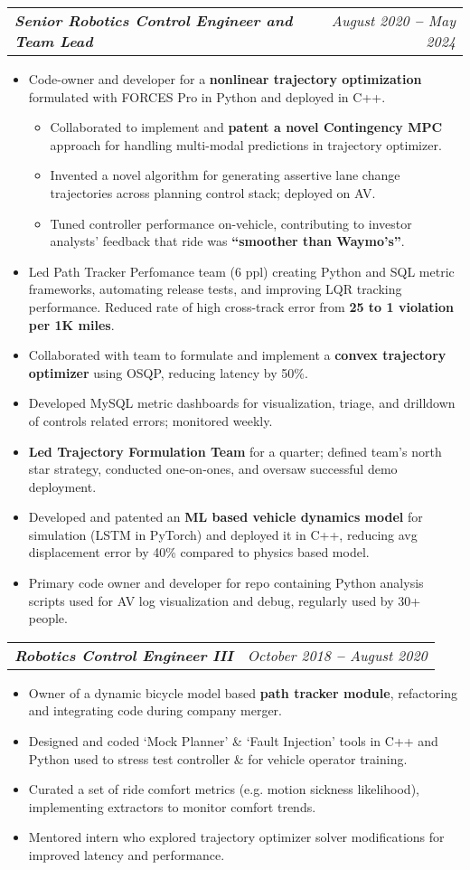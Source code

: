 \documentclass[letterpaper,11pt]{article}
\makeatletter
\def\vspaceAfterBullets{3pt} %
\def\bulletIndent{15pt} %
\newcommand{\bulletItem}[1]{
  \item\small{
    {#1}
  }
}
\newcommand{\titleAndDateHeading}[2]{
    \item
    \begin{tabular*}{1.0\textwidth}[b]{l@{\extracolsep{\fill}}r}
      \textit{\textbf{\small#1}} & \textit{\small #2}
    \end{tabular*}
}
\newcommand{\outerBulletListStart}{\begin{itemize}[leftmargin=\bulletIndent]}
\newcommand{\outerBulletListEnd}{\end{itemize}\vspace{\vspaceAfterBullets}}
\newcommand{\innerBulletListStart}{\begin{itemize}[leftmargin=\bulletIndent]}
\newcommand{\innerBulletListEnd}{\end{itemize}}
\makeatother
\begin{document}
\titleAndDateHeading
{Senior Robotics Control Engineer and Team Lead}{August 2020 \textbf{--} May 2024}
\outerBulletListStart
\bulletItem{Code-owner and developer for a \textbf{nonlinear trajectory optimization} formulated with FORCES Pro in Python and deployed in C++.}
\innerBulletListStart
\bulletItem{Collaborated to implement and \textbf{patent a novel Contingency MPC} approach for handling multi-modal predictions in trajectory optimizer.}
\bulletItem{Invented a novel algorithm for generating assertive lane change trajectories across planning control stack; deployed on AV.}
\bulletItem{Tuned controller performance on-vehicle, contributing to investor analysts’ feedback that ride was \textbf{“smoother than Waymo’s”}.}
\innerBulletListEnd
\bulletItem{Led Path Tracker Perfomance team (6 ppl) creating Python and SQL metric frameworks, automating release tests, and improving LQR tracking performance. Reduced rate of high cross-track error from \textbf{25 to 1 violation per 1K miles}.}
\bulletItem{Collaborated with team to formulate and implement a \textbf{convex trajectory optimizer} using OSQP, reducing latency by 50\%.}
\bulletItem{Developed MySQL metric dashboards for visualization, triage, and drilldown of controls related errors; monitored weekly.}
\bulletItem{\textbf{Led Trajectory Formulation Team} for a quarter; defined team’s north star strategy, conducted one-on-ones, and oversaw successful demo deployment.}
\bulletItem{Developed and patented an \textbf{ML based vehicle dynamics model} for simulation (LSTM in PyTorch) and deployed it in C++, reducing avg displacement error by 40\% compared to physics based model.}
\bulletItem{Primary code owner and developer for repo containing Python analysis scripts used for AV log visualization and debug, regularly used by 30+ people.}
\outerBulletListEnd

\titleAndDateHeading
{Robotics Control Engineer III}{October 2018 \textbf{--} August 2020}
\outerBulletListStart
\bulletItem{Owner of a dynamic bicycle model based \textbf{path tracker module}, refactoring and integrating code during company merger.}
\bulletItem{Designed and coded ‘Mock Planner’ \& ‘Fault Injection’ tools in C++ and Python used to stress test controller \& for vehicle operator training.}
\bulletItem{Curated a set of ride comfort metrics (e.g. motion sickness likelihood), implementing extractors to monitor comfort trends.}
\bulletItem{Mentored intern who explored trajectory optimizer solver modifications for improved latency and performance.}
\outerBulletListEnd
\end{document}
